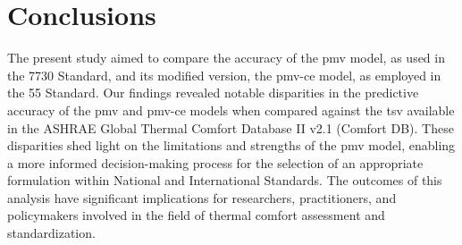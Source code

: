 
\section{Conclusions}\label{sec:conclusions}
The present study aimed to compare the accuracy of the \ac{pmv} model, as used in the \gls{7730} Standard, and its modified version, the \gls{pmv-ce} model, as employed in the \gls{55} Standard.
Our findings revealed notable disparities in the predictive accuracy of the \ac{pmv} and \gls{pmv-ce} models when compared against the \ac{tsv} available in the ASHRAE Global Thermal Comfort Database II v2.1 (Comfort DB).
These disparities shed light on the limitations and strengths of the \ac{pmv} model, enabling a more informed decision-making process for the selection of an appropriate formulation within National and International Standards.
The outcomes of this analysis have significant implications for researchers, practitioners, and policymakers involved in the field of thermal comfort assessment and standardization.